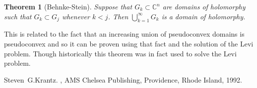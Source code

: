 \documentclass[12pt]{article}
\theoremstyle{theorem}
\newtheorem*{thm}{Theorem}
\theoremstyle{definition}
\begin{document}
\begin{thm}[Behnke-Stein]
Suppose that $G_k \subset {\mathbb{C}}^n$ are domains of holomorphy
such that $G_k \subset G_j$ whenever $k < j$.  Then
$\bigcup_{k=1}^\infty G_k$ is a domain of holomorphy.
\end{thm}

This is related to the fact that an increasing union of pseudoconvex domains is pseudoconvex and so it can be proven using that fact and the solution of the
Levi problem.  Though historically this theorem was in fact used to solve
the Levi problem.

\begin{thebibliography}{9}
Steven~G.\@ Krantz.
{\em {}},
AMS Chelsea Publishing, Providence, Rhode Island, 1992.
\end{thebibliography}
\end{document}
